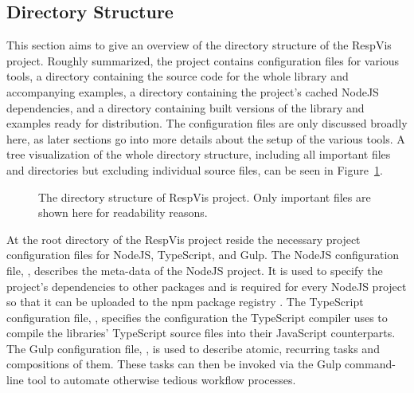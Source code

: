 \subsection{Directory Structure}

This section aims to give an overview of the directory structure of
the RespVis project.  Roughly summarized, the project contains
configuration files for various tools, a  directory
containing the source code for the whole library and accompanying
examples, a  directory containing the project's
cached NodeJS dependencies, and a  directory containing
built versions of the library and examples ready for distribution.
The configuration files are only discussed broadly here, as later
sections go into more details about the setup of the various tools.  A
tree visualization of the whole directory structure, including all
important files and directories but excluding individual source files,
can be seen in Figure~\ref{fig:RespVisDirTree}.

\begin{figure}[tp]
\centering
{}
\caption[RespVis Directory Structure]{
  The directory structure of RespVis project. 
  Only important files are shown here for readability reasons.
}
\label{fig:RespVisDirTree}
\end{figure}

At the root directory of the RespVis project reside the necessary
project configuration files for NodeJS, TypeScript, and Gulp.  The
NodeJS configuration file, , describes the
meta-data of the NodeJS project.  It is used to specify the project's
dependencies to other packages and is required for every NodeJS
project so that it can be uploaded to the npm package registry
\parencite{npm}.  The TypeScript configuration file,
, specifies the configuration the TypeScript
compiler uses to compile the libraries' TypeScript source files into
their JavaScript counterparts.  The Gulp configuration file,
, is used to describe atomic, recurring tasks and
compositions of them.  These tasks can then be invoked via the Gulp
command-line tool to automate otherwise tedious workflow processes.

